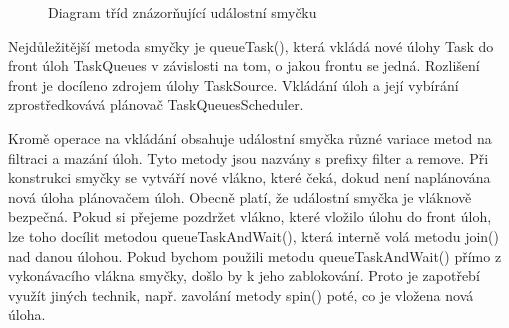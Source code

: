 \begin{figure}[H]
  \begin{center}
    \caption{Diagram tříd znázorňující událostní smyčku}
    \label{Figure.EventLoop}
  \end{center}
\end{figure}

Nejdůležitější metoda smyčky je queueTask(), která vkládá nové úlohy Task do front úloh TaskQueues v závislosti na tom, o jakou frontu se jedná. Rozlišení front je docíleno zdrojem úlohy TaskSource. Vkládání úloh a její vybírání zprostředkovává plánovač TaskQueuesScheduler.
 
Kromě operace na vkládání obsahuje událostní smyčka různé variace metod na filtraci a mazání úloh. Tyto metody jsou nazvány s prefixy filter a remove. Při konstrukci smyčky se vytváří nové vlákno, které čeká, dokud není naplánována nová úloha plánovačem úloh. Obecně platí, že událostní smyčka je vláknově bezpečná. Pokud si přejeme pozdržet vlákno, které vložilo úlohu do front úloh, lze toho docílit metodou queueTaskAndWait(), která interně volá metodu join() nad danou úlohou. Pokud bychom použili metodu queueTaskAndWait() přímo z vykonávacího vlákna smyčky, došlo by k jeho zablokování. Proto je zapotřebí využít jiných technik, např. zavolání metody spin() poté, co je vložena nová úloha.

